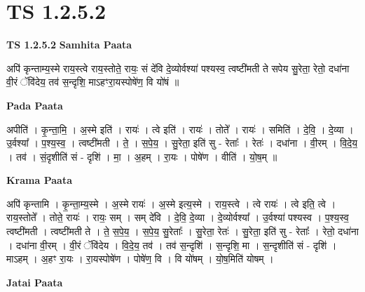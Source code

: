\documentclass[17pt]{extarticle}
\begin{document}
\section*{ TS 1.2.5.2 }

\textbf{TS 1.2.5.2 } \newline
\textbf{Samhita Paata} \newline

अपि॑ कृन्ताम्य॒स्मे राय॒स्त्वे राय॒स्तोते॒ रायः॒ सं दे॑वि दे॒व्योर्वश्या॑ पश्यस्व॒ त्वष्टी॑मती ते सपेय सु॒रेता॒ रेतो॒ दधा॑ना वी॒रं ॅवि॑देय॒ तव॑ स॒न्दृशि॒ माऽहꣳरा॒यस्पोषे॑ण॒ वि यो॑षं ॥ \newline

\textbf{Pada Paata} \newline

अपीति॑ । कृ॒न्ता॒मि॒ । अ॒स्मे इति॑ । रायः॑ । त्वे इति॑ । रायः॑ । तोते᳚ । रायः॑ । समिति॑ । दे॒वि॒ । दे॒व्या । उ॒र्वश्या᳚ । प॒श्य॒स्व॒ । त्वष्टी॑मती । ते॒ । स॒पे॒य॒ । सु॒रेता॒ इति॑ सु - रेताः᳚ । रेतः॑ । दधा॑ना । वी॒रम् । वि॒दे॒य॒ । तव॑ । सं॒दृशीति॑ सं - दृशि॑ । मा॒ । अ॒हम् । रा॒यः । पोषे॑ण । वीति॑ । यो॒ष॒म् ॥  \newline


\textbf{Krama Paata} \newline

अपि॑ कृन्तामि । कृ॒न्ता॒म्य॒स्मे । अ॒स्मे रायः॑ । अ॒स्मे इत्य॒स्मे । राय॒स्त्वे । त्वे रायः॑ । त्वे इति॒ त्वे । राय॒स्तोते᳚ । तोते॒ रायः॑ । रायः॒ सम् । सम् दे॑वि । दे॒वि॒ दे॒व्या । दे॒व्योर्वश्या᳚ । उ॒र्वश्या॑ पश्यस्व । प॒श्य॒स्व॒ त्वष्टी॑मती । त्वष्टी॑मती ते । ते॒ स॒पे॒य॒ । स॒पे॒य॒ सु॒रेताः᳚ । सु॒रेता॒ रेतः॑ । सु॒रेता॒ इति॑ सु - रेताः᳚ । रेतो॒ दधा॑ना । दधा॑ना वी॒रम् । वी॒रं ॅवि॑देय । वि॒दे॒य॒ तव॑ । तव॑ स॒न्दृशि॑ । स॒न्दृशि॒ मा । स॒न्दृशीति॑ सं - दृशि॑ । माऽहम् । अ॒हꣳ रा॒यः । रा॒यस्पोषे॑ण । पोषे॑ण॒ वि । वि यो॑षम् । यो॒ष॒मिति॑ योषम् । \newline

\textbf{Jatai Paata} \newline
\end{document}
